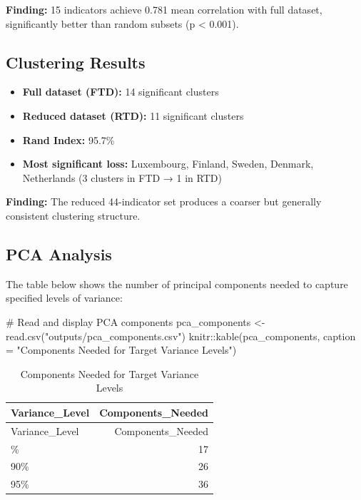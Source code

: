 \documentclass[
  letterpaper,
  DIV=11,
  numbers=noendperiod]{scrartcl}
\newenvironment{Shaded}{\begin{snugshade}}{\end{snugshade}}
\newcommand{\AttributeTok}[1]{\textcolor[rgb]{0.40,0.45,0.13}{#1}}
\newcommand{\CommentTok}[1]{\textcolor[rgb]{0.37,0.37,0.37}{#1}}
\newcommand{\FunctionTok}[1]{\textcolor[rgb]{0.28,0.35,0.67}{#1}}
\newcommand{\NormalTok}[1]{\textcolor[rgb]{0.00,0.23,0.31}{#1}}
\newcommand{\OtherTok}[1]{\textcolor[rgb]{0.00,0.23,0.31}{#1}}
\newcommand{\SpecialCharTok}[1]{\textcolor[rgb]{0.37,0.37,0.37}{#1}}
\newcommand{\StringTok}[1]{\textcolor[rgb]{0.13,0.47,0.30}{#1}}
\providecommand{\tightlist}{%
  \setlength{\itemsep}{0pt}\setlength{\parskip}{0pt}}
\begin{document}
\textbf{Finding:} 15 indicators achieve 0.781 mean correlation with full
dataset, significantly better than random subsets (p \textless{} 0.001).

\subsection{Clustering Results}\label{clustering-results}

\begin{itemize}
\tightlist
\item
  \textbf{Full dataset (FTD):} 14 significant clusters
\item
  \textbf{Reduced dataset (RTD):} 11 significant clusters\\
\item
  \textbf{Rand Index:} 95.7\%
\item
  \textbf{Most significant loss:} Luxembourg, Finland, Sweden, Denmark,
  Netherlands (3 clusters in FTD → 1 in RTD)
\end{itemize}

\textbf{Finding:} The reduced 44-indicator set produces a coarser but
generally consistent clustering structure.

\subsection{PCA Analysis}\label{pca-analysis}

The table below shows the number of principal components needed to
capture specified levels of variance:

\begin{Shaded}
\begin{Highlighting}[]
\CommentTok{\# Read and display PCA components}
\NormalTok{pca\_components }\OtherTok{\textless{}{-}} \FunctionTok{read.csv}\NormalTok{(}\StringTok{"outputs/pca\_components.csv"}\NormalTok{)}
\NormalTok{knitr}\SpecialCharTok{::}\FunctionTok{kable}\NormalTok{(pca\_components, }\AttributeTok{caption =} \StringTok{"Components Needed for Target Variance Levels"}\NormalTok{)}
\end{Highlighting}
\end{Shaded}

\begin{longtable}[]{@{}lr@{}}
\caption{Components Needed for Target Variance Levels}\tabularnewline
\toprule\noalign{}
Variance\_Level & Components\_Needed \\
\midrule\noalign{}
\endfirsthead
\toprule\noalign{}
Variance\_Level & Components\_Needed \\
\midrule\noalign{}
\endhead
\bottomrule\noalign{}
\endlastfoot
80\% & 17 \\
90\% & 26 \\
95\% & 36 \\
\end{longtable}
\end{document}
